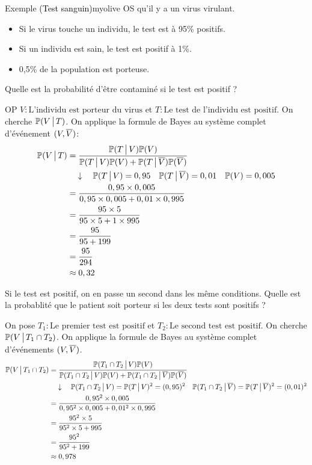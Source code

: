    \begin{omed}{Exemple \textcolor{black}{(Test sanguin)}}{myolive}
        OS qu’il y a un virus virulant. \begin{itemize}
            \item Si le virus touche un individu, le test est à 95\% positifs.
            \item Si un individu est sain, le test est positif à 1\%. 
            \item 0,5\% de la population est porteuse.
        \end{itemize}
        Quelle est la probabilité d’être contaminé si le test est positif ? 

        OP $V : \text{L’individu est porteur du virus}$ et $T : \text{Le test de l’individu est positif}$. On cherche $\mathbb{P}(V \, \big| \, T)$. On applique la formule de Bayes au système complet d’événement $(V, \overline{V})$:
        \begin{align*}
            \mathbb{P}(V \, \big| \, T) 
            &= \frac{\mathbb{P}(T \, \big| \, V) \mathbb{P}(V)}{\mathbb{P}(T \, \big| \, V) \mathbb{P}(V) + \mathbb{P}(T \, \big| \, \overline{V}) \mathbb{P}(\overline{V})} \\
            &\quad \downarrow \quad \mathbb{P}(T \, \big| \, V) = 0,95 \quad \mathbb{P}(T \, \big| \, \overline{V}) = 0,01 \quad \mathbb{P}(V) = 0,005 \\
            &= \frac{0,95 \times 0,005}{0,95 \times 0,005 + 0,01 \times 0,995} \\
            &= \frac{95 \times 5}{95 \times 5 + 1 \times 995} \\
            &= \frac{95}{95 + 199}  \\
            &= \frac{95}{294}  \\
            &\approx 0,32
        \end{align*}
        
        Si le test est positif, on en passe un second dans les même conditions. Quelle est la probablité que le patient soit porteur si les deux tests sont positifs ? 

        On pose $T_1 : \text{Le premier test est positif}$ et $T_2 : \text{Le second test est positif}$. On cherche $\mathbb{P}(V \, \big| \, T_1 \cap T_2)$. On applique la formule de Bayes au système complet d’événements $(V, \overline{V})$.
        \begin{align*}
            \mathbb{P}(V \, \big| \, T_1 \cap T_2) 
            &= \frac{\mathbb{P}(T_1 \cap T_2 \, \big| \, V) \mathbb{P}(V)}{\mathbb{P}(T_1 \cap T_2 \, \big| \, V) \mathbb{P}(V) + \mathbb{P}(T_1 \cap T_2 \, \big| \, \overline{V}) \mathbb{P}(\overline{V})} \\
            &\quad \downarrow \quad \mathbb{P}(T_1 \cap T_2 \, \big| \, V) = \mathbb{P}(T \, \big| \, V)^2 = (0,95)^2 \quad \mathbb{P}(T_1 \cap T_2 \, \big| \, \overline{V}) = \mathbb{P}(T \, \big| \, \overline{V})^2 = (0,01)^2 \\
            &= \frac{0,95^2 \times 0,005}{0,95^2 \times 0,005 + 0,01^2 \times 0,995} \\
            &= \frac{95^2 \times 5}{95^2 \times 5 + 995} \\
            &= \frac{95^2}{95^2 + 199} \\
            &\approx 0,978
        \end{align*}
    \end{omed}

